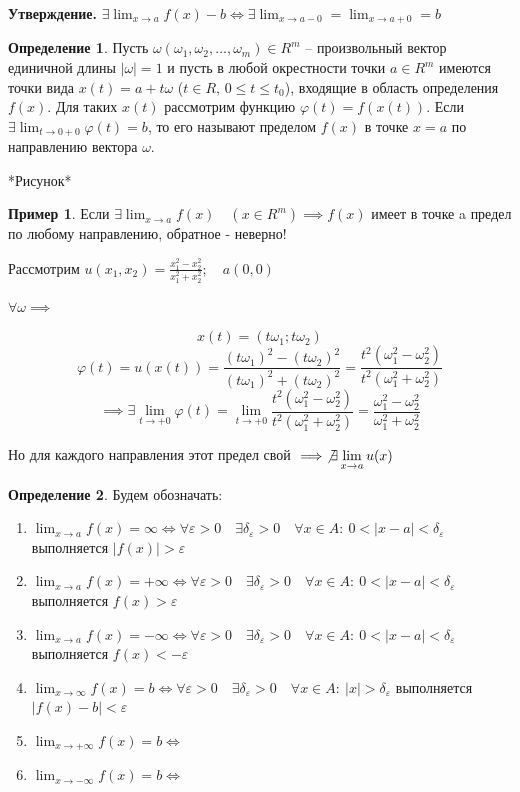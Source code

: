 \documentclass[a4paper,oneside]{article}
\newcommand{\dslim}{\displaystyle\lim}
\newcommand{\eps}{\varepsilon}
\theoremstyle{definition}
\newtheorem{definition}{Определение}[subsection]
\theoremstyle{definition}
\newtheorem*{example}{Пример}
\theoremstyle{definition}
\begin{document}
\textbf{Утверждение. }
$\exists \dslim_{x \to a} f(x) - b \iff \exists \dslim_{x \to a - 0} = \dslim_{x \to a + 0} = b$

\begin{definition}
    Пусть $\omega(\omega_1, \omega_2, \dots, \omega_m) \in R^m$ -- произвольный вектор
    единичной длины $|\omega|=1$ и пусть в любой окрестности точки $a \in R^m$ имеются 
    точки вида $x(t) = a + t \omega$ ($t \in R,\, 0 \le t \le t_0$), входящие в область определения $f(x)$.
    Для таких $x(t)$ рассмотрим функцию $ \varphi(t) = f(x(t))$. Если $\exists \dslim_{t \to 0 + 0}  \varphi(t) = b$,
    то его называют пределом $f(x)$ в точке $x = a$ по направлению вектора $\omega$.
\end{definition}


*Рисунок*

\begin{example}
    Если $\exists \dslim_{x \to a} f(x) \quad (x \in R^m) \implies f(x)$ 
    имеет в точке a предел по любому направлению, обратное - неверно!

    Рассмотрим $u(x_1, x_2) = \frac{x_1^2-x_2^2}{x_1^2+x_2^2}; \quad a(0, 0)$

    $\forall\omega \implies$

    \[ x(t) = (t \omega_1; t \omega_2) \]
    \[ 
         \varphi(t) = u(x(t)) = 
        \frac{(t \omega_1)^2 - (t \omega_2)^2}{(t \omega_1)^2 + (t \omega_2)^2} = 
        \frac{t^2 (\omega_1^2 - \omega_2^2)}{t^2 (\omega_1^2 + \omega_2^2)}
    \]
    \[
        \implies \exists \dslim_{t \to +0}  \varphi(t) = 
        \dslim_{t \to +0} \frac{t^2 (\omega_1^2 - \omega_2^2)}{t^2 (\omega_1^2 + \omega_2^2)} = 
        \frac{\omega_1^2 - \omega_2^2}{\omega_1^2 + \omega_2^2}
    \]

    Но для каждого направления этот предел свой $\implies \not\exists \dslim_{x \to a} u(x)$  
\end{example}

\begin{definition}
    Будем обозначать: 
    \begin{enumerate}
        \item $\dslim_{x \to a} f(x) = \infty \iff \forall \eps > 0 \quad \exists \delta_\eps > 0 \quad \forall x \in A:\: 0 < |x-a| < \delta_\eps$ выполняется $|f(x)| > \eps$
        \item $\dslim_{x \to a} f(x) = +\infty \iff \forall \eps > 0 \quad \exists \delta_\eps > 0 \quad \forall x \in A:\: 0 < |x-a| < \delta_\eps$ выполняется $f(x) > \eps$
        \item $\dslim_{x \to a} f(x) = -\infty \iff \forall \eps > 0 \quad \exists \delta_\eps > 0 \quad \forall x \in A:\: 0 < |x-a| < \delta_\eps$ выполняется $f(x) < -\eps$
        \item $\dslim_{x \to \infty} f(x) = b \iff \forall \eps > 0 \quad \exists \delta_\eps > 0 \quad \forall x \in A:\: |x| > \delta_\eps$ выполняется $|f(x)-b| < \eps$
        \item $\dslim_{x \to +\infty} f(x) = b \iff $
        \item $\dslim_{x \to -\infty} f(x) = b \iff $
    \end{enumerate}
\end{definition}
\end{document}
